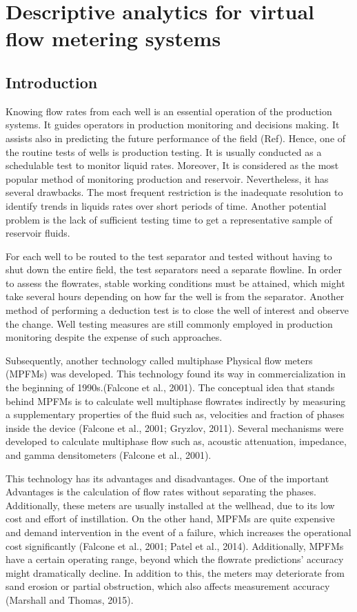 \chapter{Descriptive analytics for virtual flow metering systems}

\section{Introduction}
Knowing flow rates from each well is an essential operation of the production systems. It guides operators in production monitoring and decisions making. It assists also in predicting the future performance of the field (Ref). Hence, one of the routine tests of wells is production testing. It is usually conducted as a schedulable test to monitor liquid rates.  Moreover, It is considered as the most popular method of monitoring production and reservoir. Nevertheless, it has several drawbacks. The most frequent restriction is the inadequate resolution to identify trends in liquids rates over short periods of time. Another potential problem is the lack of sufficient testing time to get a representative sample of reservoir fluids.

For each well to be routed to the test separator and tested without having to shut down the entire field, the test separators need a separate flowline. In order to assess the flowrates, stable working conditions must be attained, which might take several hours depending on how far the well is from the separator. Another method of performing a deduction test is to close the well of interest and observe the change. Well testing measures are still commonly employed in production monitoring despite the expense of such approaches. 

Subsequently, another technology called  multiphase Physical flow meters (MPFMs) was developed. This technology found its way in commercialization in the beginning of 1990s.(Falcone et al., 2001). The conceptual idea that stands behind MPFMs is to calculate well multiphase flowrates indirectly by measuring a supplementary properties of the fluid such as, velocities and fraction of phases inside the device (Falcone et al., 2001; Gryzlov, 2011). Several mechanisms were developed to calculate multiphase flow such as, acoustic attenuation, impedance, and gamma densitometers (Falcone et al., 2001).  

This technology has its advantages and disadvantages. One of the important Advantages is the calculation of flow rates without separating the phases. Additionally, these meters are usually installed at the wellhead, due to its low cost and effort of instillation. On the other hand, MPFMs are quite expensive and demand intervention in the event of a failure, which increases the operational cost significantly (Falcone et al., 2001; Patel et al., 2014). Additionally, MPFMs have a certain operating range, beyond which the flowrate predictions' accuracy might dramatically decline. In addition to this, the meters may deteriorate from sand erosion or partial obstruction, which also affects measurement accuracy (Marshall and Thomas, 2015).

